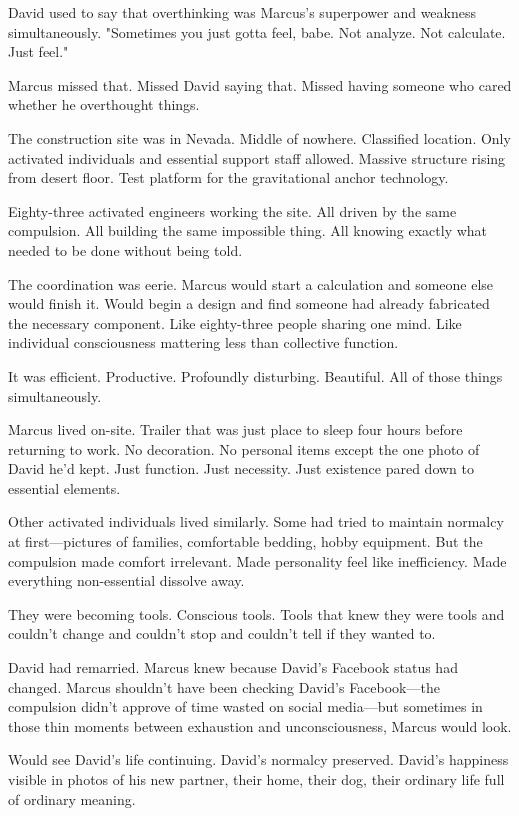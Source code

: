 David used to say that overthinking was Marcus's superpower and weakness simultaneously. "Sometimes you just gotta feel, babe. Not analyze. Not calculate. Just feel."

Marcus missed that. Missed David saying that. Missed having someone who cared whether he overthought things.

\scenebreak

The construction site was in Nevada. Middle of nowhere. Classified location. Only activated individuals and essential support staff allowed. Massive structure rising from desert floor. Test platform for the gravitational anchor technology.

Eighty-three activated engineers working the site. All driven by the same compulsion. All building the same impossible thing. All knowing exactly what needed to be done without being told.

The coordination was eerie. Marcus would start a calculation and someone else would finish it. Would begin a design and find someone had already fabricated the necessary component. Like eighty-three people sharing one mind. Like individual consciousness mattering less than collective function.

It was efficient. Productive. Profoundly disturbing. Beautiful. All of those things simultaneously.

Marcus lived on-site. Trailer that was just place to sleep four hours before returning to work. No decoration. No personal items except the one photo of David he'd kept. Just function. Just necessity. Just existence pared down to essential elements.

Other activated individuals lived similarly. Some had tried to maintain normalcy at first—pictures of families, comfortable bedding, hobby equipment. But the compulsion made comfort irrelevant. Made personality feel like inefficiency. Made everything non-essential dissolve away.

They were becoming tools. Conscious tools. Tools that knew they were tools and couldn't change and couldn't stop and couldn't tell if they wanted to.

\scenebreak

David had remarried. Marcus knew because David's Facebook status had changed. Marcus shouldn't have been checking David's Facebook—the compulsion didn't approve of time wasted on social media—but sometimes in those thin moments between exhaustion and unconsciousness, Marcus would look.

Would see David's life continuing. David's normalcy preserved. David's happiness visible in photos of his new partner, their home, their dog, their ordinary life full of ordinary meaning.

